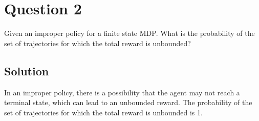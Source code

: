 \section*{Question 2}

Given an improper policy for a finite state MDP.\@
What is the probability of the set of trajectories for which the total reward is unbounded?

\subsection*{Solution}

In an improper policy, there is a possibility that the agent may not reach a terminal state, which can lead to an unbounded reward.
The probability of the set of trajectories for which the total reward is unbounded is 1.
